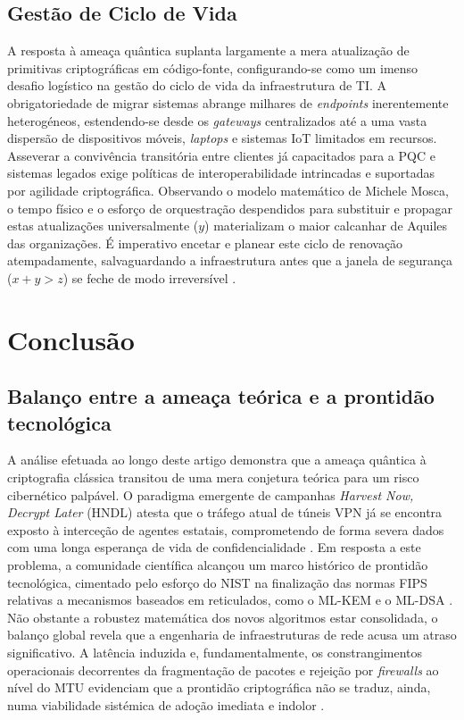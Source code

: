 \documentclass[runningheads]{llncs}
\begin{document}
\subsection{Gestão de Ciclo de Vida}
A resposta à ameaça quântica suplanta largamente a mera atualização de primitivas criptográficas em código-fonte, configurando-se como um imenso desafio logístico na gestão do ciclo de vida da infraestrutura de TI. A obrigatoriedade de migrar sistemas abrange milhares de \textit{endpoints} inerentemente heterogéneos, estendendo-se desde os \textit{gateways} centralizados até a uma vasta dispersão de dispositivos móveis, \textit{laptops} e sistemas IoT limitados em recursos. Asseverar a convivência transitória entre clientes já capacitados para a PQC e sistemas legados exige políticas de interoperabilidade intrincadas e suportadas por agilidade criptográfica. Observando o modelo matemático de Michele Mosca, o tempo físico e o esforço de orquestração despendidos para substituir e propagar estas atualizações universalmente ($y$) materializam o maior calcanhar de Aquiles das organizações. É imperativo encetar e planear este ciclo de renovação atempadamente, salvaguardando a infraestrutura antes que a janela de segurança ($x + y > z$) se feche de modo irreversível \cite{article,kundu2026postquantumcryptographicanalysismessage}.

\section{Conclusão}

\subsection{Balanço entre a ameaça teórica e a prontidão tecnológica}
A análise efetuada ao longo deste artigo demonstra que a ameaça quântica à criptografia clássica transitou de uma mera conjetura teórica para um risco cibernético palpável. O paradigma emergente de campanhas \textit{Harvest Now, Decrypt Later} (HNDL) atesta que o tráfego atual de túneis VPN já se encontra exposto à interceção de agentes estatais, comprometendo de forma severa dados com uma longa esperança de vida de confidencialidade \cite{kundu2026postquantumcryptographicanalysismessage,article}. Em resposta a este problema, a comunidade científica alcançou um marco histórico de prontidão tecnológica, cimentado pelo esforço do NIST na finalização das normas FIPS relativas a mecanismos baseados em reticulados, como o ML-KEM e o ML-DSA \cite{nist2024fips203}. Não obstante a robustez matemática dos novos algoritmos estar consolidada, o balanço global revela que a engenharia de infraestruturas de rede acusa um atraso significativo. A latência induzida e, fundamentalmente, os constrangimentos operacionais decorrentes da fragmentação de pacotes e rejeição por \textit{firewalls} ao nível do MTU evidenciam que a prontidão criptográfica não se traduz, ainda, numa viabilidade sistémica de adoção imediata e indolor \cite{cryptoeprint:2020/071,mallick2026studypostquantumstatus}.
\end{document}

